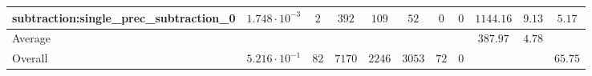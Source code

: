 \begin{tabular}{|l|c|c|c|c|c|c|c|c|c|c|}
subtraction:single\_prec\_subtraction\_0         & $ 1.748 \cdot 10^{-3} $ & $ 2      $ & $ 392  $ & $ 109  $ & $ 52    $ & $ 0  $ & $ 0 $ & $ 1144.16     $ & $ 9.13    $ & $ 5.17    $ \\
\hline
Average                                          & $                     $ & $        $ & $      $ & $      $ & $       $ & $    $ & $   $ & $ 387.97      $ & $ 4.78    $ & $         $ \\
\hline
Overall                                          & $ 5.216 \cdot 10^{-1} $ & $ 82     $ & $ 7170 $ & $ 2246 $ & $ 3053  $ & $ 72 $ & $ 0 $ & $             $ & $         $ & $ 65.75   $ \\
\hline
\end{tabular}
